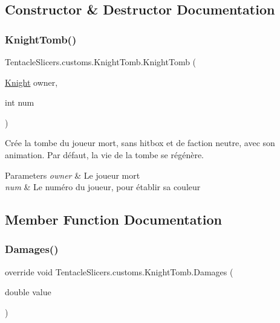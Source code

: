 \subsection{Constructor \& Destructor Documentation}
\mbox{\label{class_tentacle_slicers_1_1customs_1_1_knight_tomb_a6a12111b657c9fcba696204f19c6fb76}} 
\subsubsection{\texorpdfstring{Knight\+Tomb()}{KnightTomb()}}
{\footnotesize\ttfamily Tentacle\+Slicers.\+customs.\+Knight\+Tomb.\+Knight\+Tomb (\begin{DoxyParamCaption}\item[{\hyperlink{class_tentacle_slicers_1_1customs_1_1_knight}{Knight}}]{owner,  }\item[{int}]{num }\end{DoxyParamCaption})}



Crée la tombe du joueur mort, sans hitbox et de faction neutre, avec son animation. Par défaut, la vie de la tombe se régénère. 


\begin{DoxyParams}{Parameters}
{\em owner} & Le joueur mort \\
\hline
{\em num} & Le numéro du joueur, pour établir sa couleur \\
\hline
\end{DoxyParams}


\subsection{Member Function Documentation}
\mbox{\label{class_tentacle_slicers_1_1customs_1_1_knight_tomb_a5a34249a8265891f3c3eb6d469f11b93}} 
\subsubsection{\texorpdfstring{Damages()}{Damages()}}
{\footnotesize\ttfamily override void Tentacle\+Slicers.\+customs.\+Knight\+Tomb.\+Damages (\begin{DoxyParamCaption}\item[{double}]{value }\end{DoxyParamCaption})\hspace{0.3cm}{\ttfamily [virtual]}}



